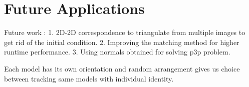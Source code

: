 \documentclass{bmvc2k}
\begin{document}
\section{Future Applications}
Future work : 
1. 2D-2D correspondence to triangulate from multiple images to get rid of the initial condition. 
2. Improving the matching method for higher runtime performance.
3. Using normals obtained for solving p3p problem. 

Each model has its own orientation and random arrangement gives us choice between tracking same models with individual identity. 



\end{document}
